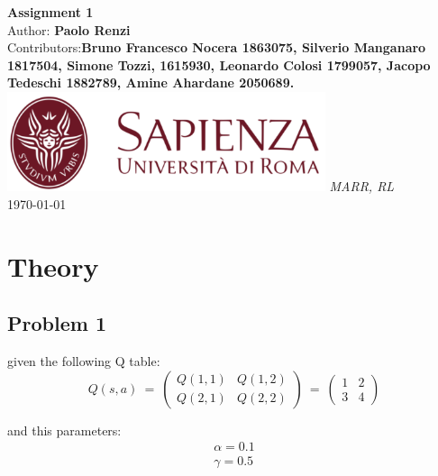 \documentclass[10pt,a4paper]{article}
\begin{document}
\begin{titlepage}
    \begin{center}
        \vspace*{1cm}
        \Huge\textbf{Assignment 1}\\
        \vspace{1.5cm}
        \Large Author:
        \textbf{Paolo Renzi}\\
        \Large Contributors:\textbf{Bruno Francesco Nocera 1863075, Silverio Manganaro 1817504, Simone Tozzi, 1615930, Leonardo Colosi 1799057, Jacopo Tedeschi 1882789, Amine Ahardane 2050689.}
        \vspace{0.5cm}
        \vfill
        \includegraphics[width=0.7\textwidth]{images/sapienza_logo.png}
        \vfill
        \vspace{0.8cm}
        \Large \textit{MARR, RL}\\
        \today
    \end{center}
\end{titlepage}
\newpage

\section*{Theory}
\subsection*{Problem 1}

given the following Q table:
\vspace{5pt}
\begin{equation*} 
    Q(s,a) \:=\:
    \begin{pmatrix}
        Q(1,1) & Q(1,2)\\
        Q(2,1) & Q(2,2)
    \end{pmatrix}
    \:=\: 
    \begin{pmatrix}
        1 & 2\\
        3 & 4
    \end{pmatrix}
\end{equation*}
\vspace{5pt}


and this parameters:
\begin{align*}
    \alpha = 0.1 \\
    \gamma = 0.5
\end{align*}
\end{document}
